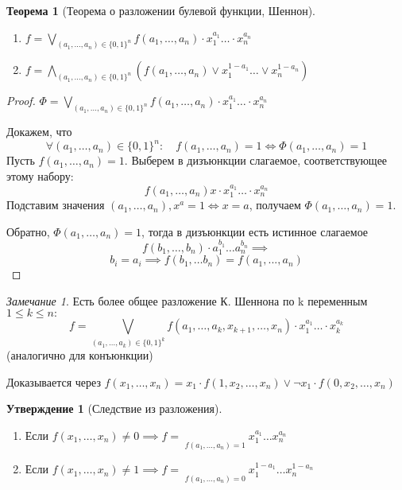 \documentclass[a4paper]{article}
\newtheorem{theorem}{Теорема}[section]
\theoremstyle{definition}
\newtheorem*{statement}{Утверждение}
\theoremstyle{remark}
\newtheorem*{remark}{Замечание}
\begin{document}
    \begin{theorem}[Теорема о разложении булевой функции, Шеннон]
        \begin{enumerate}
            $f(x_1, \dots, x_n)$ - БФ. Тогда
            \item 
            $f = \bigvee\limits_{(a_1, \dots, a_n)\in \{0, 1\}^n} f(a_1, \dots, a_n) \cdot x_1^{a_1} \dots \cdot x_n^{a_n}$
            \item 
            $f = \bigwedge\limits_{(a_1, \dots, a_n)\in \{0, 1\}^n} (f(a_1, \dots, a_n) \vee x_1^{1-a_1} \dots \vee x_n^{1 -a_n})$
        \end{enumerate}
    \end{theorem}
    \begin{proof}
        $\Phi = \bigvee\limits_{(a_1, \dots, a_n)\in \{0, 1\}^n} f(a_1, \dots, a_n) \cdot x_1^{a_1} \dots \cdot x_n^{a_n}$

        Докажем, что $$\forall (a_1, \dots, a_n)\in \{0, 1\}^n: \quad f(a_1, \dots, a_n) = 1 \Leftrightarrow \Phi(a_1, \dots, a_n) = 1$$
        Пусть $f(a_1, \dots, a_n) = 1.$ Выберем в дизъюнкции слагаемое,
        соответствующее этому набору:
        $$f(a_1, \dots, a_n) x \cdot x_1^{a_1} \dots \cdot x_n^{a_n}$$
        Подставим значения $(a_1, \dots, a_n), x^a = 1 \Leftrightarrow x = a$,
        получаем $\Phi(a_1, \dots, a_n) = 1$.

        Обратно, $\Phi(a_1, \dots, a_n) = 1$, тогда в дизъюнкции есть истинное слагаемое
        $$f(b_1, \dots, b_n) \cdot a_1^{b_1}\dots a_n^{b_n}\implies$$
        $$b_i = a_i \implies f(b_1, \dots b_n) = f(a_1, ... , a_n)$$ 
    \end{proof}
    \begin{remark}
        Есть более общее разложение К. Шеннона по k переменным $1 \leq k \leq n:$
        $$f = \bigvee\limits_{(a_1, \dots, a_k)\in \{0, 1\}^k} f(a_1, \dots, a_k, x_{k+1}, \dots, x_n) \cdot x_1^{a_1} \dots \cdot x_k^{a_k}$$
        (аналогично для конъюнкции)

        Доказывается через $f(x_1, \dots, x_n) = x_1 \cdot f(1, x_2, \dots, x_n) \vee \neg x_1 \cdot f(0, x_2, \dots, x_n)$
    \end{remark}
    \begin{statement}[Следствие из разложения]
        $ $\\
        \begin{enumerate}
            \item Если $f(x_1, \dots, x_n) \neq 0 \implies f = \mathop{\bigvee\limits_{(a_1, \dots, a_n)\in \{0, 1\}^n}}\limits_{f(a_1, \dots, a_n)=1}x_1^{a_1}\dots x_n^{a_n}$
            \item Если $f(x_1, \dots, x_n) \neq 1 \implies f = \mathop{\bigwedge\limits_{(a_1, \dots, a_n)\in \{0, 1\}^n}}\limits_{f(a_1, \dots, a_n)=0}x_1^{1 - a_1}\dots x_n^{1 - a_n}$
        \end{enumerate}
    \end{statement}
\end{document}
